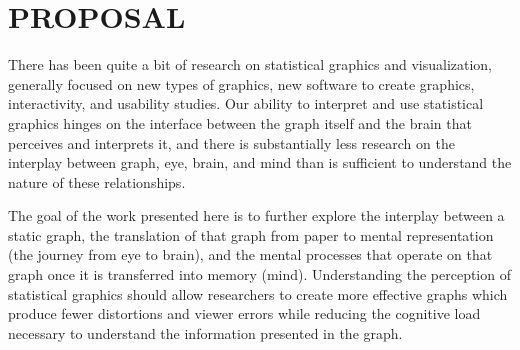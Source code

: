 \documentclass[11pt]{isuthesis}\usepackage[]{graphicx}\usepackage[]{color}
\begin{document}

% 
\tableofcontents
{} \cleardoublepage {}
{}
\listoftables
\cleardoublepage {} {}
\listoffigures
% 
% 
\newpage
{}

\setcounter{chapter}{-1}
\chapter{PROPOSAL}
There has been quite a bit of research on statistical graphics and visualization, generally focused on new types of graphics, new software to create graphics, interactivity, and usability studies. Our ability to interpret and use statistical graphics hinges on the interface between the graph itself and the brain that perceives and interprets it, and there is substantially less research on the interplay between graph, eye, brain, and mind than is sufficient to understand the nature of these relationships. 

The goal of the work presented here is to further explore the interplay between a static graph, the translation of that graph from paper to mental representation (the journey from eye to brain), and the mental processes that operate on that graph once it is transferred into memory (mind). Understanding the perception of statistical graphics should allow researchers to create more effective graphs which produce fewer distortions and viewer errors while reducing the cognitive load necessary to understand the information presented in the graph. 
\end{document}
